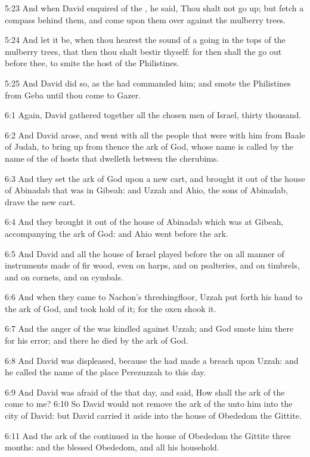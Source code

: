5:23 And when David enquired of the \LORD, he said, Thou shalt not go up; but fetch a compass behind them, and come upon them over against the mulberry trees.

5:24 And let it be, when thou hearest the sound of a going in the tops of the mulberry trees, that then thou shalt bestir thyself: for then shall the \LORD go out before thee, to smite the host of the Philistines.

5:25 And David did so, as the \LORD had commanded him; and smote the Philistines from Geba until thou come to Gazer.

6:1 Again, David gathered together all the chosen men of Israel, thirty thousand.

6:2 And David arose, and went with all the people that were with him from Baale of Judah, to bring up from thence the ark of God, whose name is called by the name of the \LORD of hosts that dwelleth between the cherubims.

6:3 And they set the ark of God upon a new cart, and brought it out of the house of Abinadab that was in Gibeah: and Uzzah and Ahio, the sons of Abinadab, drave the new cart.

6:4 And they brought it out of the house of Abinadab which was at Gibeah, accompanying the ark of God: and Ahio went before the ark.

6:5 And David and all the house of Israel played before the \LORD on all manner of instruments made of fir wood, even on harps, and on psalteries, and on timbrels, and on cornets, and on cymbals.

6:6 And when they came to Nachon's threshingfloor, Uzzah put forth his hand to the ark of God, and took hold of it; for the oxen shook it.

6:7 And the anger of the \LORD was kindled against Uzzah; and God smote him there for his error; and there he died by the ark of God.

6:8 And David was displeased, because the \LORD had made a breach upon Uzzah: and he called the name of the place Perezuzzah to this day.

6:9 And David was afraid of the \LORD that day, and said, How shall the ark of the \LORD come to me?  6:10 So David would not remove the ark of the \LORD unto him into the city of David: but David carried it aside into the house of Obededom the Gittite.

6:11 And the ark of the \LORD continued in the house of Obededom the Gittite three months: and the \LORD blessed Obededom, and all his household.

